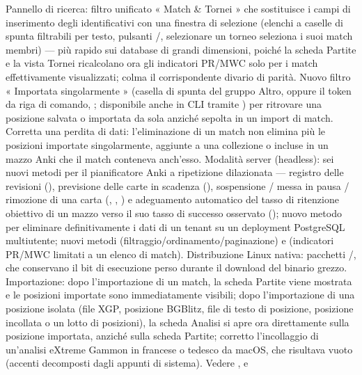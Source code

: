 \documentclass[letterpaper,10pt,italian]{sphinxmanual}
\begin{document}
\begin{savenotes}
\begin{longtable}{}
\begin{varwidth}[t]{}
Pannello di ricerca: filtro unificato « Match \& Tornei » che sostituisce i campi di inserimento degli identificativi con una finestra di selezione (elenchi a caselle di spunta filtrabili per testo, pulsanti /, selezionare un torneo seleziona i suoi match membri) — più rapido sui database di grandi dimensioni, poiché la scheda Partite e la vista Tornei ricalcolano ora gli indicatori PR/MWC solo per i match effettivamente visualizzati;  colma il corrispondente divario di parità. Nuovo filtro « Importata singolarmente » (casella di spunta del gruppo Altro, oppure il token  da riga di comando, ; disponibile anche in CLI tramite ) per ritrovare una posizione salvata o importata da sola anziché sepolta in un import di match. Corretta una perdita di dati: l’eliminazione di un match non elimina più le posizioni importate singolarmente, aggiunte a una collezione o incluse in un mazzo Anki che il match conteneva anch’esso. Modalità server (headless): sei nuovi metodi per il pianificatore Anki a ripetizione dilazionata — registro delle revisioni (), previsione delle carte in scadenza (), sospensione / messa in pausa / rimozione di una carta (, , ) e adeguamento automatico del tasso di ritenzione obiettivo di un mazzo verso il suo tasso di successo osservato (); nuovo metodo  per eliminare definitivamente i dati di un tenant su un deployment PostgreSQL multiutente; nuovi metodi  (filtraggio/ordinamento/paginazione) e  (indicatori PR/MWC limitati a un elenco di match). Distribuzione Linux nativa: pacchetti /, che conservano il bit di esecuzione perso durante il download del binario grezzo. Importazione: dopo l’importazione di un match, la scheda Partite viene mostrata e le posizioni importate sono immediatamente visibili; dopo l’importazione di una posizione isolata (file XGP, posizione BGBlitz, file di testo di posizione, posizione incollata o un lotto di posizioni), la scheda Analisi si apre ora direttamente sulla posizione importata, anziché sulla scheda Partite; corretto l’incollaggio di un’analisi eXtreme Gammon in francese o tedesco da macOS, che risultava vuoto (accenti decomposti dagli appunti di sistema). Vedere {\hyperref[\detokenize{mode_headless:headless}]{}}, {\hyperref[\detokenize{cmd_mode:cmd-mode}]{}} e 
\end{varwidth}
\end{longtable}
\end{savenotes}
\end{document}
